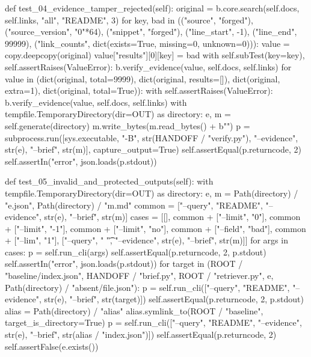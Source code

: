     def test_04_evidence_tamper_rejected(self):
        original = b.core.search(self.docs, self.links, "all", "README", 3)
        for key, bad in (("source", "forged"), ("source_version", "0"*64), ("snippet", "forged"),
                         ("line_start", -1), ("line_end", 99999),
                         ("link_counts", dict(exists=True, missing=0, unknown=0))):
            value = copy.deepcopy(original)
            value["results"][0][key] = bad
            with self.subTest(key=key), self.assertRaises(ValueError):
                b.verify_evidence(value, self.docs, self.links)
        for value in (dict(original, total=9999), dict(original, results=[]),
                      dict(original, extra=1), dict(original, total=True)):
            with self.assertRaises(ValueError):
                b.verify_evidence(value, self.docs, self.links)
        with tempfile.TemporaryDirectory(dir=OUT) as directory:
            e, m = self.generate(directory)
            m.write_bytes(m.read_bytes() + b"\nFORGED")
            p = subprocess.run([sys.executable, "-B", str(HANDOFF / "verify.py"),
                                "--evidence", str(e), "--brief", str(m)], capture_output=True)
            self.assertEqual(p.returncode, 2)
            self.assertIn("error", json.loads(p.stdout))

    def test_05_invalid_and_protected_outputs(self):
        with tempfile.TemporaryDirectory(dir=OUT) as directory:
            e, m = Path(directory) / "e.json", Path(directory) / "m.md"
            common = ["--query", "README", "--evidence", str(e), "--brief", str(m)]
            cases = [[], common + ["--limit", "0"], common + ["--limit", "-1"],
                     common + ["--limit", "no"], common + ["--field", "bad"],
                     common + ["--lim", "1"], ["--query", " \n\t", "--evidence", str(e), "--brief", str(m)]]
            for args in cases:
                p = self.run_cli(args)
                self.assertEqual(p.returncode, 2, p.stdout)
                self.assertIn("error", json.loads(p.stdout))
            for target in (ROOT / "baseline/index.json", HANDOFF / "brief.py", ROOT / "retriever.py",
                           e, Path(directory) / "absent/file.json"):
                p = self.run_cli(["--query", "README", "--evidence", str(e), "--brief", str(target)])
                self.assertEqual(p.returncode, 2, p.stdout)
            alias = Path(directory) / "alias"
            alias.symlink_to(ROOT / "baseline", target_is_directory=True)
            p = self.run_cli(["--query", "README", "--evidence", str(e), "--brief", str(alias / "index.json")])
            self.assertEqual(p.returncode, 2)
            self.assertFalse(e.exists())

